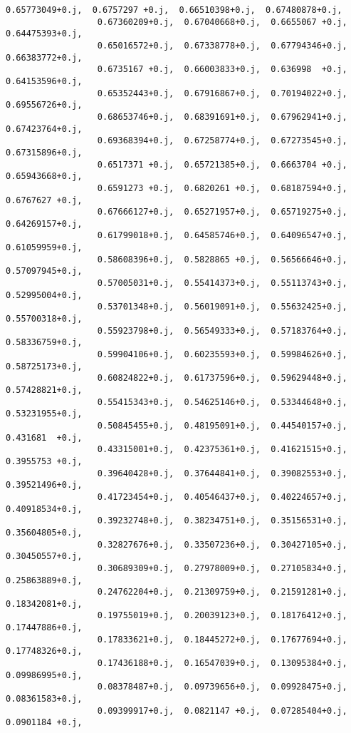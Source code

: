 \documentclass[11pt]{article}
\begin{document}
\begin{Verbatim}[commandchars=\\\{\}]
                  0.65773049+0.j,  0.6757297 +0.j,  0.66510398+0.j,  0.67480878+0.j,
                  0.67360209+0.j,  0.67040668+0.j,  0.6655067 +0.j,  0.64475393+0.j,
                  0.65016572+0.j,  0.67338778+0.j,  0.67794346+0.j,  0.66383772+0.j,
                  0.6735167 +0.j,  0.66003833+0.j,  0.636998  +0.j,  0.64153596+0.j,
                  0.65352443+0.j,  0.67916867+0.j,  0.70194022+0.j,  0.69556726+0.j,
                  0.68653746+0.j,  0.68391691+0.j,  0.67962941+0.j,  0.67423764+0.j,
                  0.69368394+0.j,  0.67258774+0.j,  0.67273545+0.j,  0.67315896+0.j,
                  0.6517371 +0.j,  0.65721385+0.j,  0.6663704 +0.j,  0.65943668+0.j,
                  0.6591273 +0.j,  0.6820261 +0.j,  0.68187594+0.j,  0.6767627 +0.j,
                  0.67666127+0.j,  0.65271957+0.j,  0.65719275+0.j,  0.64269157+0.j,
                  0.61799018+0.j,  0.64585746+0.j,  0.64096547+0.j,  0.61059959+0.j,
                  0.58608396+0.j,  0.5828865 +0.j,  0.56566646+0.j,  0.57097945+0.j,
                  0.57005031+0.j,  0.55414373+0.j,  0.55113743+0.j,  0.52995004+0.j,
                  0.53701348+0.j,  0.56019091+0.j,  0.55632425+0.j,  0.55700318+0.j,
                  0.55923798+0.j,  0.56549333+0.j,  0.57183764+0.j,  0.58336759+0.j,
                  0.59904106+0.j,  0.60235593+0.j,  0.59984626+0.j,  0.58725173+0.j,
                  0.60824822+0.j,  0.61737596+0.j,  0.59629448+0.j,  0.57428821+0.j,
                  0.55415343+0.j,  0.54625146+0.j,  0.53344648+0.j,  0.53231955+0.j,
                  0.50845455+0.j,  0.48195091+0.j,  0.44540157+0.j,  0.431681  +0.j,
                  0.43315001+0.j,  0.42375361+0.j,  0.41621515+0.j,  0.3955753 +0.j,
                  0.39640428+0.j,  0.37644841+0.j,  0.39082553+0.j,  0.39521496+0.j,
                  0.41723454+0.j,  0.40546437+0.j,  0.40224657+0.j,  0.40918534+0.j,
                  0.39232748+0.j,  0.38234751+0.j,  0.35156531+0.j,  0.35604805+0.j,
                  0.32827676+0.j,  0.33507236+0.j,  0.30427105+0.j,  0.30450557+0.j,
                  0.30689309+0.j,  0.27978009+0.j,  0.27105834+0.j,  0.25863889+0.j,
                  0.24762204+0.j,  0.21309759+0.j,  0.21591281+0.j,  0.18342081+0.j,
                  0.19755019+0.j,  0.20039123+0.j,  0.18176412+0.j,  0.17447886+0.j,
                  0.17833621+0.j,  0.18445272+0.j,  0.17677694+0.j,  0.17748326+0.j,
                  0.17436188+0.j,  0.16547039+0.j,  0.13095384+0.j,  0.09986995+0.j,
                  0.08378487+0.j,  0.09739656+0.j,  0.09928475+0.j,  0.08361583+0.j,
                  0.09399917+0.j,  0.0821147 +0.j,  0.07285404+0.j,  0.0901184 +0.j,

\end{Verbatim}
\end{document}
